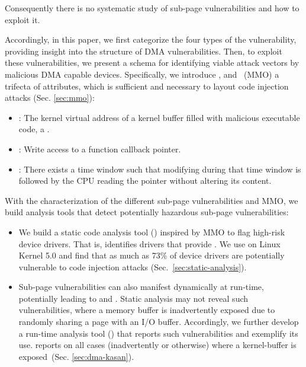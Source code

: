 Consequently there is no systematic study of sub-page vulnerabilities and how to exploit it.

Accordingly, in this paper, we first categorize the four types of the \subpage{} vulnerability, providing insight into the structure of DMA vulnerabilities.
Then, to exploit these vulnerabilities, we present a schema for identifying viable attack vectors by malicious DMA capable devices. Specifically, we introduce \motivation{}, \means and \oportunity~(MMO) a trifecta of attributes, which is sufficient and necessary to layout code injection attacks (Sec. \ref{sec:mmo}):

\begin{itemize}
    \item \motivation: The kernel virtual address of a kernel buffer filled with malicious executable code, a \mabaf.
    \item \means: Write access to a function callback pointer.
    \item \oportunity: There exists a time window such that modifying \means during that time window is followed by the CPU reading the pointer without altering its content. 
\end{itemize} 



With the characterization of the different sub-page vulnerabilities and MMO, we build analysis tools that detect potentially hazardous sub-page vulnerabilities:

\begin{itemize}
    \item We build a static code analysis tool (\tool) inspired by MMO to flag high-risk device drivers. That is, \tool identifies drivers that provide \means.
We use \tool on Linux Kernel 5.0 and find that as much as 73\% of device drivers are potentially vulnerable to code injection attacks (Sec.~\ref{sec:static-analysis}). 

    \item Sub-page vulnerabilities can also manifest dynamically at run-time, potentially leading to \means and \oportunity. 
Static analysis may not reveal such vulnerabilities, where a memory buffer is inadvertently exposed due to randomly sharing a page with an I/O buffer. Accordingly, we further develop a run-time analysis tool (\dkasan) that reports such vulnerabilities and exemplify its use. \dkasan reports on all cases (inadvertently or otherwise) where a kernel-buffer is exposed~(Sec. \ref{sec:dma-kasan}).
\end{itemize}


